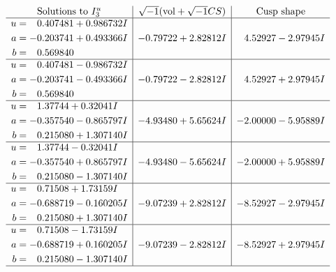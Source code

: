 \documentclass[1p]{elsarticle_modified}
\theoremstyle{definition}
\newcommand{\I}{\sqrt{-1}}
\begin{document}
$$\begin{array}{c|c|c}  
\text{Solutions to }I^u_{3}& \I (\text{vol} + \sqrt{-1}CS) & \text{Cusp shape}\\
 \hline 
\begin{aligned}
u &= \phantom{-}0.407481 + 0.986732 I \\
a &= -0.203741 + 0.493366 I \\
b &= \phantom{-}0.569840\phantom{ +0.000000I}\end{aligned}
 & -0.79722 + 2.82812 I & \phantom{-}4.52927 - 2.97945 I \\ \hline\begin{aligned}
u &= \phantom{-}0.407481 - 0.986732 I \\
a &= -0.203741 - 0.493366 I \\
b &= \phantom{-}0.569840\phantom{ +0.000000I}\end{aligned}
 & -0.79722 - 2.82812 I & \phantom{-}4.52927 + 2.97945 I \\ \hline\begin{aligned}
u &= \phantom{-}1.37744 + 0.32041 I \\
a &= -0.357540 - 0.865797 I \\
b &= \phantom{-}0.215080 + 1.307140 I\end{aligned}
 & -4.93480 + 5.65624 I & -2.00000 - 5.95889 I \\ \hline\begin{aligned}
u &= \phantom{-}1.37744 - 0.32041 I \\
a &= -0.357540 + 0.865797 I \\
b &= \phantom{-}0.215080 - 1.307140 I\end{aligned}
 & -4.93480 - 5.65624 I & -2.00000 + 5.95889 I \\ \hline\begin{aligned}
u &= \phantom{-}0.71508 + 1.73159 I \\
a &= -0.688719 - 0.160205 I \\
b &= \phantom{-}0.215080 + 1.307140 I\end{aligned}
 & -9.07239 + 2.82812 I & -8.52927 - 2.97945 I \\ \hline\begin{aligned}
u &= \phantom{-}0.71508 - 1.73159 I \\
a &= -0.688719 + 0.160205 I \\
b &= \phantom{-}0.215080 - 1.307140 I\end{aligned}
 & -9.07239 - 2.82812 I & -8.52927 + 2.97945 I\\
 \hline 
 \end{array}$$\newpage\newpage\renewcommand{\arraystretch}{1}
\end{document}
